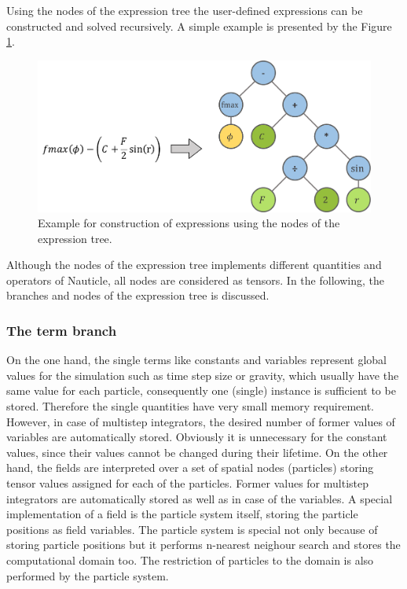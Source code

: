 \documentclass[a4paper,12pt,openany]{book}
\theoremstyle{break}
\begin{document}
Using the nodes of the expression tree the user-defined expressions can be constructed and solved recursively. A simple example is presented by the Figure \ref{fig:expression_example}.
\begin{figure}[h]
  \includegraphics[scale=0.5]{expression_example.pdf}
  \centering
  \caption{Example for construction of expressions using the nodes of the expression tree.}
  \label{fig:expression_example}
\end{figure}\vspace*{3pt}

Although the nodes of the expression tree implements different quantities and operators of Nauticle, all nodes are considered as tensors. In the following, the branches and nodes of the expression tree is discussed.

\subsubsection{The term branch}
On the one hand, the single terms like constants and variables represent global values for the simulation such as time step size or gravity, which usually have the same value for each particle, consequently one (single) instance is sufficient to be stored. Therefore the single quantities have very small memory requirement. However, in case of multistep integrators, the desired number of former values of variables are automatically stored. Obviously it is unnecessary for the constant values, since their values cannot be changed during their lifetime. On the other hand, the fields are interpreted over a set of spatial nodes (particles) storing tensor values assigned for each of the particles. Former values for multistep integrators are automatically stored as well as in case of the variables. A special implementation of a field is the particle system itself, storing the particle positions as field variables. The particle system is special not only because of storing particle positions but it performs n-nearest neighour search and stores the computational domain too. The restriction of particles to the domain is also performed by the particle system.
\end{document}
